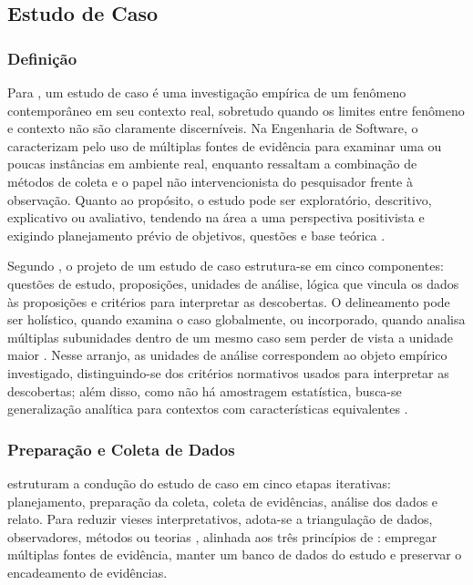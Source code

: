 \subsection{Estudo de Caso}
\label{subsec:ref_estudo_de_caso}

\subsubsection{Definição}
\label{subsubsec:ref_ec_definicao}

Para , um estudo de caso é uma investigação empírica de um fenômeno contemporâneo em seu contexto real, sobretudo quando os limites entre fenômeno e contexto não são claramente discerníveis. Na Engenharia de Software,  o caracterizam pelo uso de múltiplas fontes de evidência para examinar uma ou poucas instâncias em ambiente real, enquanto  ressaltam a combinação de métodos de coleta e o papel não intervencionista do pesquisador frente à observação. Quanto ao propósito, o estudo pode ser exploratório, descritivo, explicativo ou avaliativo, tendendo na área a uma perspectiva positivista e exigindo planejamento prévio de objetivos, questões e base teórica \cite{wohlin2024,runeson2009}.

Segundo , o projeto de um estudo de caso estrutura-se em cinco componentes: questões de estudo, proposições, unidades de análise, lógica que vincula os dados às proposições e critérios para interpretar as descobertas. O delineamento pode ser holístico, quando examina o caso globalmente, ou incorporado, quando analisa múltiplas subunidades dentro de um mesmo caso sem perder de vista a unidade maior \cite{yin2015,runeson2012}. Nesse arranjo, as unidades de análise correspondem ao objeto empírico investigado, distinguindo-se dos critérios normativos usados para interpretar as descobertas; além disso, como não há amostragem estatística, busca-se generalização analítica para contextos com características equivalentes \cite{yin2015,runeson2009}.

\subsubsection{Preparação e Coleta de Dados}
\label{subsubsec:ref_ec_preparacao}

 estruturam a condução do estudo de caso em cinco etapas iterativas: planejamento, preparação da coleta, coleta de evidências, análise dos dados e relato. Para reduzir vieses interpretativos, adota-se a triangulação de dados, observadores, métodos ou teorias \cite{runeson2009}, alinhada aos três princípios de : empregar múltiplas fontes de evidência, manter um banco de dados do estudo e preservar o encadeamento de evidências.

